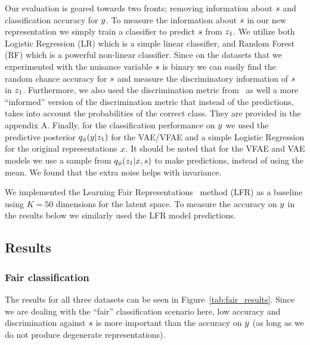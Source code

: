 Our evaluation is geared towards two fronts; removing information about $\*s$ and classification accuracy for $\*y$. To measure the information about $\*s$ in our new representation we simply train a classifier to predict $\*s$ from $\*z_1$. We utilize both Logistic Regression (LR) which is a simple linear classifier, and Random Forest (RF) which is a powerful non-linear classifier. Since on the datasets that we experimented with the nuisance variable $\*s$ is binary we can easily find the random chance accuracy for $\*s$ and measure the discriminatory information of $\*s$ in $\*z_1$. Furthermore, we also used the discrimination metric from~\cite{zemel2013learning} as well a  more ``informed'' version of the discrimination metric that instead of the predictions, takes into account the probabilities of the correct class. They are provided in the appendix A. Finally, for the classification performance on $\*y$ we used the predictive posterior $q_\phi(\*y|\*z_1)$ for the VAE/VFAE and a simple Logistic Regression for the original representations $\*x$. It should be noted that for the VFAE and VAE models we use a sample from $q_\phi(\*z_1|\*x, \*s)$ to make predictions, instead of using the mean. We found that the extra noise helps with invariance. 

We implemented the Learning Fair Representations~\citep{zemel2013learning} method (LFR) as a baseline using $K=50$ dimensions for the latent space. To measure the accuracy on $\*y$ in the results below we similarly used the LFR model predictions.

\subsection{Results}
\subsubsection{Fair classification}
The results for all three datasets can be seen in Figure~\ref{tab:fair_results}. Since we are dealing with the ``fair'' classification scenario here, low accuracy and discrimination against $\*s$ is more important than the accuracy on $\*y$ (as long as we do not produce degenerate representations).

